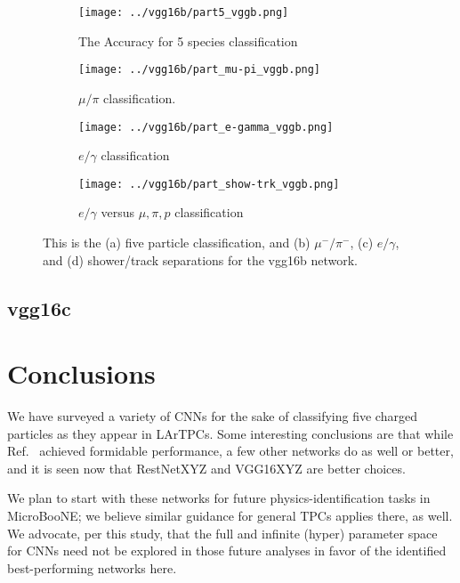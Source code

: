 \documentclass[11pt,a4paper]{article}
\begin{document}
\begin{figure}[t]
  \centering  
\begin{subfigure}[t]{0.45\textwidth}
\centering
\texttt{[image: ../vgg16b/part5\_vggb.png]}\\
\label{a}
\caption{The Accuracy for 5 species classification}
\end{subfigure}%
\hfill
\begin{subfigure}[t]{0.45\textwidth}
\centering
\texttt{[image: ../vgg16b/part\_mu-pi\_vggb.png]}\\
\label{b}
\caption{$\mu/\pi$ classification.}
\end{subfigure}%

\bigskip

\begin{subfigure}[t]{0.45\textwidth}
\centering
\texttt{[image: ../vgg16b/part\_e-gamma\_vggb.png]}\\
\label{c}
\caption{$e/\gamma$ classification}
\end{subfigure}%
\hfill
\begin{subfigure}[t]{0.45\textwidth}
\centering
\texttt{[image: ../vgg16b/part\_show-trk\_vggb.png]}
\label{d}
\caption{$e/\gamma$ versus $\mu,\pi,p$ classification}
\end{subfigure}%
\caption{This is the (a) five particle classification, and (b) $\mu^-/\pi^-$, (c) $e/\gamma$, and (d) shower/track separations for the vgg16b network.}
\label{fig:vgg16b}
\end{figure}


\subsection{vgg16c}



\section {Conclusions}

We have surveyed a variety of CNNs for the sake of classifying five charged particles as they appear in LArTPCs. Some interesting conclusions are that while Ref.~\cite{uB-JINST} achieved formidable performance, a few other networks do as well or better, and it is seen now that RestNetXYZ and VGG16XYZ are better choices.

We plan to start with these networks for future physics-identification tasks in MicroBooNE; we believe similar guidance for general TPCs applies there, as well. We advocate, per this study, that the full and infinite (hyper) parameter space for CNNs need not be explored in those future analyses in favor of the identified best-performing networks here.
\end{document}
